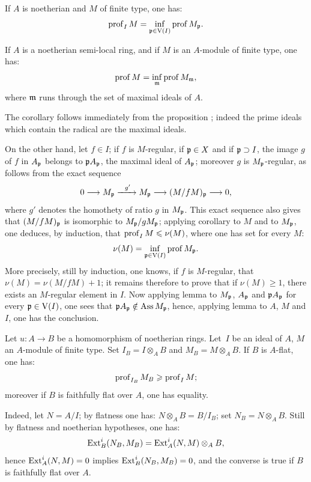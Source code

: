\begin{proposition} \label{III.2.9}
If \(A\) is noetherian and \(M\) of finite type, one has:
\[
\operatorname{prof}_I M = \inf_{\mathfrak{p} \in \operatorname{V} (I)} \operatorname{prof} M_{\mathfrak{p}}.
\]
\end{proposition}

\begin{corollary} \label{III.2.10}
If \(A\) is a noetherian semi-local ring, and if \(M\) is an
\(A\)-module of finite type, one has:
\[
\operatorname{prof} M = \inf_{\mathfrak{m}} \operatorname{prof} M_{\mathfrak{m}},
\]
where \(\mathfrak{m} \) runs through the set of maximal ideals of \(A\).
\end{corollary}

The corollary follows immediately from the proposition ;
indeed the prime ideals which contain the radical are the maximal
ideals.

On the other hand, let \(f\in I\); if \(f\) is \(M\)-regular, if
\(\mathfrak{p}\in X\) and if \(\mathfrak{p}\supset I\), the image \(g\) of \(f\) in
\(A_{\mathfrak{p}}\) belongs to \(\mathfrak{p} A_{\mathfrak{p}}\), the maximal ideal of \(A_{\mathfrak{p}}\);
moreover \(g\) is \(M_{\mathfrak{p}}\)-regular, as follows from the exact sequence
\begin{equation} \label{eq:III.2.3} 0 \to M_\pp \lto{g'} M_\pp \to (M/fM)_\pp \to 0,
\end{equation}
where \(g'\) denotes the homothety of ratio \(g\) in \(M_{\mathfrak{p}}\). This
exact sequence also gives that \((M/fM)_{\mathfrak{p}}\) is isomorphic to
\(M_{\mathfrak{p}}/gM_{\mathfrak{p}}\); applying corollary  to \(M\) and to
\(M_{\mathfrak{p}}\), one deduces, by induction, that \(\operatorname{prof}_I M\leqslant \nu(M)\),
where one has set for every \(M\):
\[
\nu(M)=\inf_{\mathfrak{p}\in\operatorname{V}(I)} \operatorname{prof} M_{\mathfrak{p}}.
\]
More precisely, still by induction, one knows, if \(f\) is
\(M\)-regular, that \(\nu(M)= \nu(M/fM)+1\); it remains therefore to
prove that if \(\nu(M)\geq 1\), there exists an \(M\)-regular element
in \(I\). Now applying lemma  to \(M_{\mathfrak{p}}\), \(A_{\mathfrak{p}}\) and
\(\mathfrak{p} A_{\mathfrak{p}}\) for every \(\mathfrak{p}\in \operatorname{V}(I)\), one sees that
\(\mathfrak{p} A_{\mathfrak{p}} \notin \operatorname{Ass} M_{\mathfrak{p}}\), hence, applying lemma  to
\(A\), \(M\) and \(I\), one has the conclusion.

\begin{proposition} \label{III.2.11}
Let \(u\colon A\to B\) be a homomorphism of noetherian rings. Let~\(I\)
be an ideal of \(A\), \(M\) an \(A\)-module of finite type. Set
\(I_B=I\otimes_A B\) and \(M_B=M\otimes_A B\). If \(B\) is \(A\)-flat,
one has:
\[
\operatorname{prof}_{I_B} M_B \geqslant \operatorname{prof}_I M;
\]
moreover if \(B\) is faithfully flat over \(A\), one has equality.
\end{proposition}

Indeed, let \(N=A/I\); by flatness one has: \(N\otimes_A B=B/I_B\); set
\(N_B=N\otimes_A B\). Still by flatness and noetherian hypotheses, one
has:
\[
\operatorname{Ext}_B^i (N_B, M_B) = \operatorname{Ext}_A^i(N, M)\otimes_A B,
\]
hence \(\operatorname{Ext}_A^i(N, M) = 0 \) implies \(\operatorname{Ext}_B^i(N_B, M_B)=0\), and the
converse is true if \(B\) is faithfully flat over \(A\).
